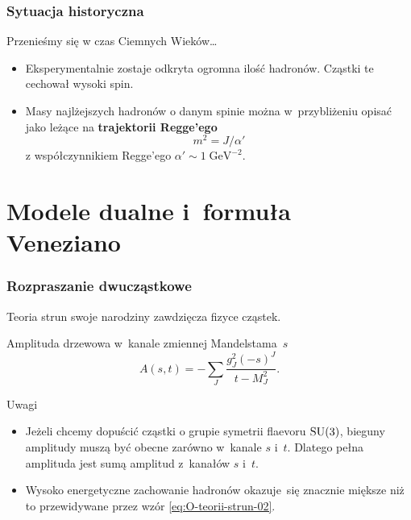 \documentclass[10pt,t]{beamer}
\begin{document}
\begin{frame}
  \frametitle{Sytuacja historyczna}


  Przenieśmy się w czas Ciemnych Wieków\ldots
  \begin{itemize}
    \RaggedRight

  \item Eksperymentalnie zostaje odkryta ogromna ilość hadronów.
    Cząstki te cechował wysoki spin.

  \item Masy najlżejszych hadronów o danym spinie można w~przybliżeniu
    opisać jako leżące na \textbf{trajektorii Regge’ego}
    \begin{equation}
      \label{eq:O-teorii-strun-01}
      m^{ 2 } = J / \alpha'
    \end{equation}
    z współczynnikiem Regge’ego
    $\alpha' \sim 1\; \mathrm{GeV}^{ -2 }$.

  \end{itemize}

\end{frame}










\section{Modele dualne i~formuła Veneziano}



\begin{frame}
  \frametitle{Rozpraszanie dwucząstkowe}


  Teoria strun swoje narodziny zawdzięcza fizyce cząstek.

  Amplituda drzewowa w~kanale zmiennej Mandelstama~$s$
  \begin{equation}
    \label{eq:O-teorii-strun-02}
    A( s, t ) =
    -\sum_{ J } \frac{ g^{ 2 }_{ J } ( -s )^{ J } }{ t - M^{ 2 }_{ J } }.
  \end{equation}

  Uwagi
  \begin{itemize}
    \RaggedRight

  \item Jeżeli chcemy dopuścić cząstki o grupie symetrii flaevoru
    $\mathrm{SU}( 3 )$, bieguny amplitudy muszą być obecne zarówno w~kanale
    $s$ i~$t$. Dlatego pełna amplituda jest sumą amplitud z~kanałów
    $s$ i~$t$.

  \item Wysoko energetyczne zachowanie hadronów okazuje~się znacznie
    miększe niż to przewidywane przez wzór \eqref{eq:O-teorii-strun-02}.

  \end{itemize}

\end{frame}
\end{document}
